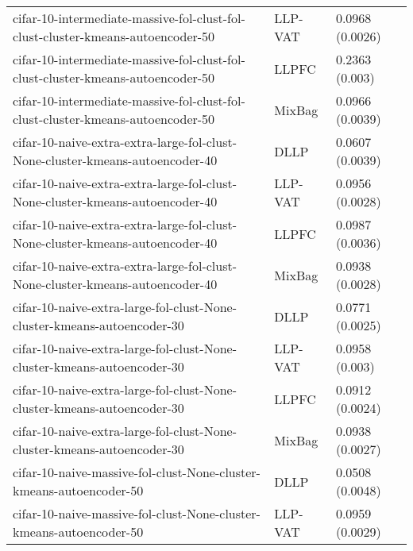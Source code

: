 \begin{longtable}{lll}
                              cifar-10-intermediate-massive-fol-clust-fol-clust-cluster-kmeans-autoencoder-50 &   LLP-VAT &                           0.0968 (0.0026) \\
                              cifar-10-intermediate-massive-fol-clust-fol-clust-cluster-kmeans-autoencoder-50 &     LLPFC &                            0.2363 (0.003) \\
                              cifar-10-intermediate-massive-fol-clust-fol-clust-cluster-kmeans-autoencoder-50 &    MixBag &                           0.0966 (0.0039) \\
                                cifar-10-naive-extra-extra-large-fol-clust-None-cluster-kmeans-autoencoder-40 &      DLLP &                           0.0607 (0.0039) \\
                                cifar-10-naive-extra-extra-large-fol-clust-None-cluster-kmeans-autoencoder-40 &   LLP-VAT &                           0.0956 (0.0028) \\
                                cifar-10-naive-extra-extra-large-fol-clust-None-cluster-kmeans-autoencoder-40 &     LLPFC &                           0.0987 (0.0036) \\
                                cifar-10-naive-extra-extra-large-fol-clust-None-cluster-kmeans-autoencoder-40 &    MixBag &                           0.0938 (0.0028) \\
                                      cifar-10-naive-extra-large-fol-clust-None-cluster-kmeans-autoencoder-30 &      DLLP &                           0.0771 (0.0025) \\
                                      cifar-10-naive-extra-large-fol-clust-None-cluster-kmeans-autoencoder-30 &   LLP-VAT &                            0.0958 (0.003) \\
                                      cifar-10-naive-extra-large-fol-clust-None-cluster-kmeans-autoencoder-30 &     LLPFC &                           0.0912 (0.0024) \\
                                      cifar-10-naive-extra-large-fol-clust-None-cluster-kmeans-autoencoder-30 &    MixBag &                           0.0938 (0.0027) \\
                                          cifar-10-naive-massive-fol-clust-None-cluster-kmeans-autoencoder-50 &      DLLP &                           0.0508 (0.0048) \\
                                          cifar-10-naive-massive-fol-clust-None-cluster-kmeans-autoencoder-50 &   LLP-VAT &                           0.0959 (0.0029) \\

\end{longtable}
